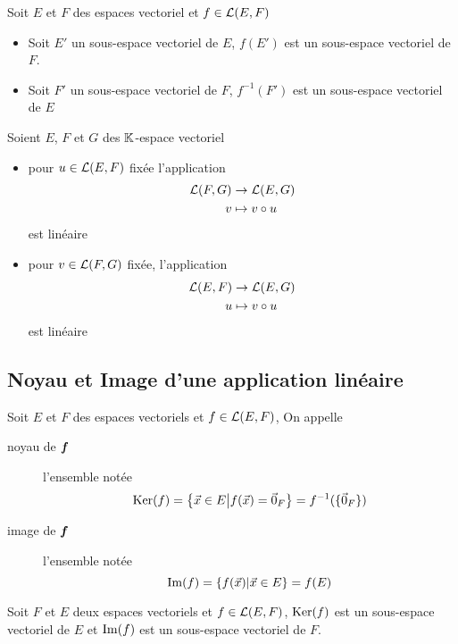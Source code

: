 \begin{prp}
Soit $E$ et $F$ des espaces vectoriel et $f \in \operatorname{\mathcal{L}}(E, F)$
\begin{itemize}
    \item Soit $E'$ un sous-espace vectoriel de $E$, $f(E')$ est un
    sous-espace vectoriel de $F$.
    \item Soit $F'$ un sous-espace vectoriel de $F$, $f^{-1}(F')$ est un
    sous-espace vectoriel de $E$
\end{itemize}
\end{prp}

\begin{prp}
Soient $E$, $F$ et $G$ des $\mathbb{K}$-espace vectoriel
\begin{itemize}
    \item pour $u \in \operatorname{\mathcal{L}}(E, F)$ fixée l'application
    \begin{align*}
        \operatorname{\mathcal{L}}(F, G) &\to \operatorname{\mathcal{L}}(E, G) \\
        v &\mapsto v \circ u
    \end{align*}
    est linéaire
    \item pour $v \in \operatorname{\mathcal{L}}(F, G)$ fixée, l'application
    \begin{align*}
        \operatorname{\mathcal{L}}(E, F) &\to \operatorname{\mathcal{L}}(E, G) \\
        u &\mapsto v \circ u
    \end{align*}
    est linéaire
\end{itemize}
\end{prp}


\subsection{Noyau et Image d'une application linéaire}

\begin{dfn}
Soit $E$ et $F$ des espaces vectoriels et $f \in \operatorname{\mathcal{L}}(E, F)$,
On appelle
\begin{description}
    \item[noyau de $\boldsymbol{f}$] l'ensemble notée
    \[
        \operatorname{Ker}(f) = \left\{ \vec{x} \in E \middle|
        f(\vec{x}) = \vec{0}_F \right\} = f^{-1}(\{\vec{0}_F\})
    \]
    \item[image de $\boldsymbol{f}$] l'ensemble notée
    \[
        \operatorname{Im}(f) = \left\{ f(\vec{x}) \middle| \vec{x} \in E \right\}
        = f(E)
    \]
\end{description}
\end{dfn}

\begin{prp}
Soit $F$ et $E$ deux espaces vectoriels et $f \in \operatorname{\mathcal{L}}(E, F)$,
$\operatorname{Ker}(f)$ est un sous-espace vectoriel de $E$ et $\operatorname{Im}(f)$ est un
sous-espace vectoriel de $F$.
\end{prp}

